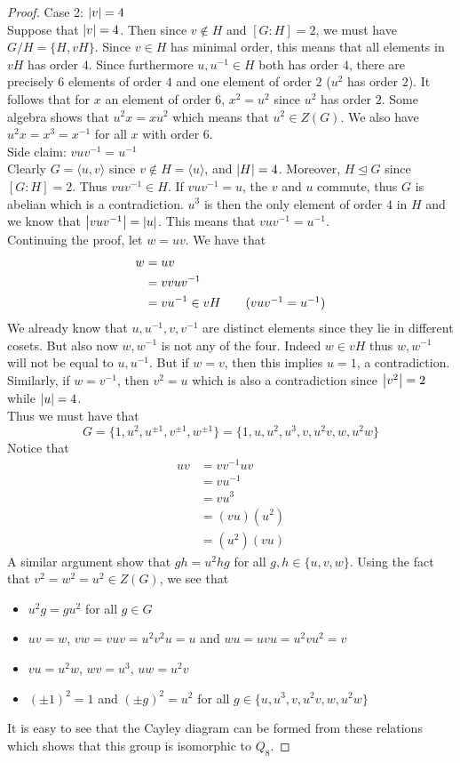\documentclass[a4paper]{article}
\begin{document}
\begin{thm}{}{}
\begin{proof}
Case 2: $\abs{v}=4$\\
Suppose that $\abs{v}=4$. Then since $v\notin H$ and $[G:H]=2$, we must have $G/H=\{H,vH\}$. Since $v\in H$ has minimal order, this means that all elements in $vH$ has order $4$. Since furthermore $u,u^{-1}\in H$ both has order $4$, there are precisely $6$ elements of order $4$ and one element of order $2$ ($u^2$ has order $2$). It follows that for $x$ an element of order $6$, $x^2=u^2$ since $u^2$ has order $2$. Some algebra shows that $u^2x=xu^2$ which means that $u^2\in Z(G)$. We also have $u^2x=x^3=x^{-1}$ for all $x$ with order $6$. \\
Side claim: $vuv^{-1}=u^{-1}$\\
Clearly $G=\langle u,v\rangle $ since $v\notin H=\langle u\rangle$, and $\abs{H}=4$. Moreover, $H\trianglelefteq G$ since $[G:H]=2$. Thus $vuv^{-1}\in H$. If $vuv^{-1}=u$, the $v$ and $u$ commute, thus $G$ is abelian which is a contradiction. $u^3$ is then the only element of order $4$ in $H$ and we know that $\abs{vuv^{-1}}=\abs{u}$. This means that $vuv^{-1}=u^{-1}$. \\
Continuing the proof, let $w=uv$. We have that 
\begin{align*}
w&=uv\\
&=vvuv^{-1}\\
&=vu^{-1}\in vH\tag{$vuv^{-1}=u^{-1}$}\\
\end{align*}
We already know that $u,u^{-1},v,v^{-1}$ are distinct elements since they lie in different cosets. But also now $w,w^{-1}$ is not any of the four. Indeed $w\in vH$ thus $w,w^{-1}$ will not be equal to $u,u^{-1}$. But if $w=v$, then this implies $u=1$, a contradiction. Similarly, if $w=v^{-1}$, then $v^2=u$ which is also a contradiction since $\abs{v^2}=2$ while $\abs{u}=4$. \\
Thus we must have that $$G=\{1,u^2,u^{\pm 1}, v^{\pm 1}, w^{\pm 1}\}=\{1,u,u^2,u^3,v,u^2v,w,u^2w\}$$ Notice that 
\begin{align*}
uv&=vv^{-1}uv\\
&=vu^{-1}\\
&=vu^3\\
&=(vu)(u^2)\\
&=(u^2)(vu)
\end{align*}
A similar argument show that $gh=u^2hg$ for all $g,h\in\{u,v,w\}$. Using the fact that $v^2=w^2=u^2\in Z(G)$, we see that 
\begin{itemize}
\item $u^2g=gu^2$ for all $g\in G$
\item $uv=w$, $vw=vuv=u^2v^2u=u$ and $wu=uvu=u^2vu^2=v$
\item $vu=u^2w$, $wv=u^3$, $uw=u^2v$
\item $(\pm 1)^2=1$ and $(\pm g)^2=u^2$ for all $g\in\{u,u^3,v,u^2v,w,u^2w\}$
\end{itemize}
It is easy to see that the Cayley diagram can be formed from these relations which shows that this group is isomorphic to $Q_8$. 
\end{proof}
\end{thm}
\end{document}
